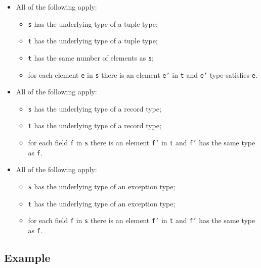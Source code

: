 \documentclass{book}
\begin{document}
\begin{itemize}
  \item All of the following apply:
    \begin{itemize}
    \item \texttt{s} has the underlying type of a tuple type;
    \item \texttt{t} has the underlying type of a tuple type;
    \item \texttt{t} has the same number of elements as \texttt{s};
    \item for each element \texttt{e} in \texttt{s} there is an element \texttt{e'} in \texttt{t} and \texttt{e'}
      type-satisfies \texttt{e}.
    \end{itemize}

  \item All of the following apply:
    \begin{itemize}
    \item \texttt{s} has the underlying type of a record type;
    \item \texttt{t} has the underlying type of a record type;
    \item for each field \texttt{f} in \texttt{s} there is an element \texttt{f'} in \texttt{t} and \texttt{f'} has
      the same type as \texttt{f}.
    \end{itemize}

  \item All of the following apply:
    \begin{itemize}
    \item \texttt{s} has the underlying type of an exception type;
    \item \texttt{t} has the underlying type of an exception type;
    \item for each field \texttt{f} in \texttt{s} there is an element \texttt{f'} in \texttt{t} and \texttt{f'} has
      the same type as \texttt{f}.
    \end{itemize}
  \end{itemize}

  \subsection{Example}


\end{document}

